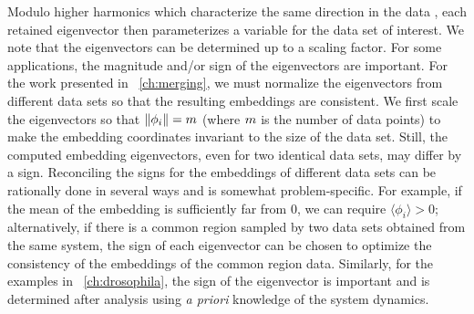 %




Modulo higher harmonics which characterize the same direction in the data 
, each retained eigenvector then parameterizes a variable for the data set of interest.
%
We note that the eigenvectors can be determined up to a scaling factor.
%
For some applications, the magnitude and/or sign of the eigenvectors are important. 
%
For the work presented in \chap~\ref{ch:merging}, we must normalize the eigenvectors from different data sets so that the resulting embeddings are consistent.
%
We first scale the eigenvectors so that $\|\phi_i\| = m$ (where $m$ is the number of data points)
to make the embedding coordinates invariant to the size of the data set.
%
Still, the computed embedding eigenvectors, even for two identical data sets, may differ by a sign.
%
Reconciling the signs for the embeddings of different data sets can be rationally done in several ways and is somewhat problem-specific.
%
For example, if the mean of the embedding is sufficiently far from 0, we can require $\langle \phi_i \rangle > 0$;
alternatively, if there is a common region sampled by two data sets obtained from the same system, the sign of each eigenvector can be chosen to optimize the consistency of the embeddings of the common region data.
%
%
Similarly, for the examples in \chap~\ref{ch:drosophila}, the sign of the eigenvector is important and is determined after analysis using {\em a priori} knowledge of the system dynamics. 



